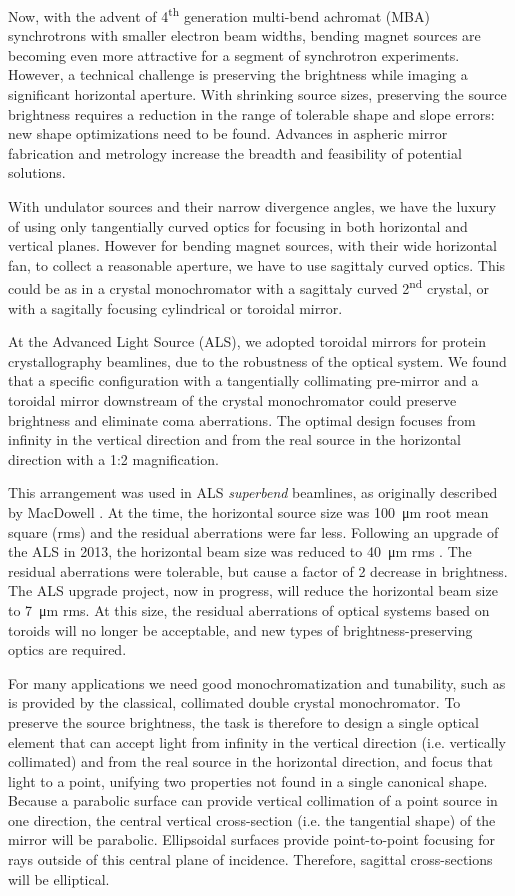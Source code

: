 \documentclass{iucr}       %
\begin{document}
Now, with the advent of 4\textsuperscript{th} generation multi-bend achromat (MBA) synchrotrons with smaller electron beam widths, bending magnet sources are becoming even more attractive for a segment of synchrotron experiments. However, a technical challenge is preserving the brightness while imaging a significant horizontal aperture. With shrinking source sizes, preserving the source brightness requires a reduction in the range of tolerable shape and slope errors: new shape optimizations need to be found. Advances in aspheric mirror fabrication and metrology increase the breadth and feasibility of potential solutions.

With undulator sources and their narrow divergence angles, we have the luxury of using only tangentially curved optics for focusing in both horizontal and vertical planes. However for bending magnet sources, with their wide horizontal fan, to collect a reasonable aperture, we have to use sagittaly curved optics. This could be as in a crystal monochromator with a sagittaly curved 2\textsuperscript{nd} crystal, or with a sagitally focusing cylindrical or toroidal mirror.

At the Advanced Light Source (ALS), we adopted toroidal mirrors for protein crystallography beamlines, due to the robustness of the optical system. We found that a specific configuration with a tangentially collimating pre-mirror and a toroidal mirror downstream of the crystal monochromator could preserve brightness and eliminate coma aberrations. The optimal design focuses from infinity in the vertical direction and from the real source in the horizontal direction with a 1:2 magnification.

This arrangement was used in ALS \emph{superbend} beamlines, as originally described by MacDowell \cite{MacDowell2004}. At the time, the horizontal source size was \SI{100}{\micro\meter} root mean square (rms) and the residual aberrations were far less. Following an upgrade of the ALS in 2013, the horizontal beam size was reduced to \SI{40}{\micro\meter} rms \cite{Steier_2014}. The residual aberrations were tolerable, but cause a factor of 2 decrease in brightness. The ALS upgrade project, now in progress, will reduce the horizontal beam size to \SI{7}{\micro\meter} rms. At this size, the residual aberrations of optical systems based on toroids will no longer be acceptable, and new types of brightness-preserving optics are required.

For many applications we need good monochromatization and tunability, such as is provided by the classical, collimated double crystal monochromator. To preserve the source brightness, the task is therefore to design a single optical element that can accept light from infinity in the vertical direction (i.e. vertically collimated) and from the real source in the horizontal direction, and focus that light to a point, unifying two properties not found in a single canonical shape. Because a parabolic surface can provide vertical collimation of a point source in one direction, the central vertical cross-section (i.e. the tangential shape) of the mirror will be parabolic. Ellipsoidal surfaces provide point-to-point focusing for rays outside of this central plane of incidence. Therefore, sagittal cross-sections will be elliptical.
\end{document}

